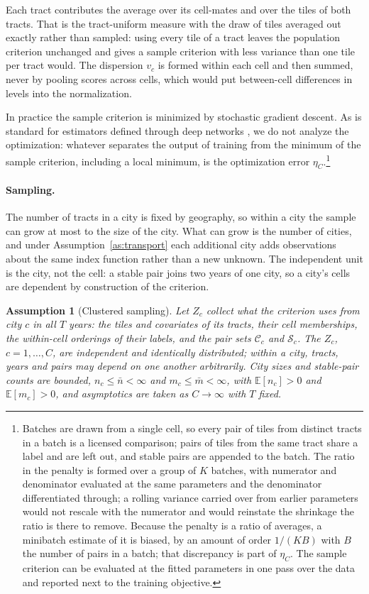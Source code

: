 \documentclass[11pt]{article}
\newtheorem{assumption}{Assumption}
\theoremstyle{remark}
\newcommand{\E}{\mathbb{E}}
\newcommand{\Cc}{\mathcal{C}}
\newcommand{\Ss}{\mathcal{S}}
\begin{document}
Each tract contributes the average over its cell-mates and over the tiles of both tracts. That is the
tract-uniform measure with the draw of tiles averaged out exactly rather than sampled: using every tile
of a tract leaves the population criterion unchanged and gives a sample criterion with less variance
than one tile per tract would. The dispersion $v_c$ is formed within each cell and then summed, never by
pooling scores across cells, which would put between-cell differences in levels into the normalization.

In practice the sample criterion is minimized by stochastic gradient descent. As is standard for
estimators defined through deep networks \citep{farrell2021deep, schmidthieber2020}, we do not analyze
the optimization: whatever separates the output of training from the minimum of the sample criterion,
including a local minimum, is the optimization error $\eta_C$.\footnote{Batches are drawn from a single
cell, so every pair of tiles from distinct tracts in a batch is a licensed comparison; pairs of tiles
from the same tract share a label and are left out, and stable pairs are appended to the batch. The
ratio in the penalty is formed over a group of $K$ batches, with numerator and denominator evaluated at
the same parameters and the denominator differentiated through; a rolling variance carried over from
earlier parameters would not rescale with the numerator and would reinstate the shrinkage the ratio is
there to remove. Because the penalty is a ratio of averages, a minibatch estimate of it is biased, by
an amount of order $1/(KB)$ with $B$ the number of pairs in a batch; that discrepancy is part of
$\eta_C$. The sample criterion can be evaluated at the fitted parameters in one pass over the data and
reported next to the training objective.}

\paragraph{Sampling.} The number of tracts in a city is fixed by geography, so within a city the sample
can grow at most to the size of the city. What can grow is the number of cities, and under
Assumption~\ref{as:transport} each additional city adds observations about the same index function
rather than a new unknown. The independent unit is the city, not the cell: a stable pair joins two
years of one city, so a city's cells are dependent by construction of the criterion.

\begin{assumption}[Clustered sampling]\label{as:cluster}
Let $Z_c$ collect what the criterion uses from city $c$ in all $T$ years: the tiles and covariates of
its tracts, their cell memberships, the within-cell orderings of their labels, and the pair sets $\Cc_c$
and $\Ss_c$. The $Z_c$, $c=1,\dots,C$, are independent and identically distributed; within a city,
tracts, years and pairs may depend on one another arbitrarily. City sizes and stable-pair counts are
bounded, $n_c \le \bar{n} < \infty$ and $m_c \le \bar{m} < \infty$, with $\E[n_c]>0$ and $\E[m_c]>0$,
and asymptotics are taken as $C \to \infty$ with $T$ fixed.
\end{assumption}
\end{document}
